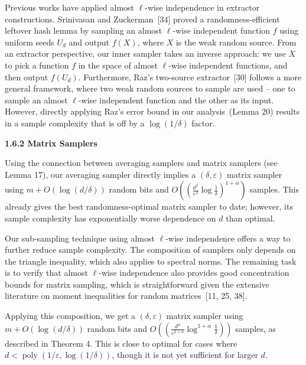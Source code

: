 \documentclass[10pt,a4paper]{article}
\begin{document}
Previous works have applied almost $\ell$-wise independence in extractor constructions. Srinivasan and Zuckerman [34] proved a randomness-efficient leftover hash lemma by sampling an almost $\ell$-wise independent function $f$ using uniform seeds $U_{d}$ and output $f(X)$, where $X$ is the weak random source. From an extractor perspective, our inner sampler takes an inverse approach: we use $X$ to pick a function $f$ in the space of almost $\ell$-wise independent functions, and then output $f(U_{d})$. Furthermore, Raz’s two-source extractor [30] follows a more general framework, where two weak random sources to sample are used – one to sample an almost $\ell$-wise independent function and the other as its input. However, directly applying Raz’s error bound in our analysis (Lemma 20) results in a sample complexity that is off by a $\log(1/\delta)$ factor.\par





\par\medskip\noindent\textbf{
1.6.2 Matrix Samplers}\par




Using the connection between averaging samplers and matrix samplers (see Lemma 17), our averaging sampler directly implies a $(\delta,\varepsilon)$ matrix sampler using $m+O(\log(d/\delta))$ random bits and $O((\frac{d^{2}}{\varepsilon^{2}}\log\frac{1}{\delta})^{1+\alpha})$ samples. This already gives the best randomness-optimal matrix sampler to date; however, its sample complexity has exponentially worse dependence on $d$ than optimal.\par




Our sub-sampling technique using almost $\ell$-wise independence offers a way to further reduce sample complexity.
The composition of samplers only depends on the triangle inequality, which also applies to spectral norms.
The remaining task is to verify that almost $\ell$-wise independence also provides good concentration bounds for matrix sampling, which is straightforward given the extensive literature on moment inequalities for random matrices [11, 25, 38].\par




Applying this composition, we get a $(\delta,\varepsilon)$ matrix sampler using $m+O(\log(d/\delta))$ random bits and $O((\frac{d^{\alpha}}{\varepsilon^{2+\alpha}}\log^{1+\alpha}\frac{1}{\delta}))$ samples, as described in Theorem 4. This is close to optimal for cases where $d<\operatorname*{poly}(1/\varepsilon,\log(1/\delta))$, though it is not yet sufficient for
larger $d$.\par
\end{document}
